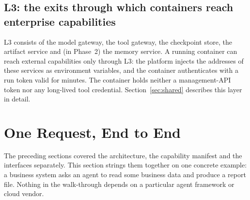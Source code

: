 \subsection{L3: the exits through which containers reach enterprise capabilities}

L3 consists of the model gateway, the tool gateway, the checkpoint store, the artifact service and (in Phase~2) the memory service. A running container can reach external capabilities only through L3: the platform injects the addresses of these services as environment variables, and the container authenticates with a run token valid for minutes. The container holds neither a management-API token nor any long-lived tool credential. Section~\ref{sec:shared} describes this layer in detail.

\section{One Request, End to End}
\label{sec:lifecycle}

The preceding sections covered the architecture, the capability manifest and the interfaces separately. This section strings them together on one concrete example: a business system asks an agent to read some business data and produce a report file. Nothing in the walk-through depends on a particular agent framework or cloud vendor.

